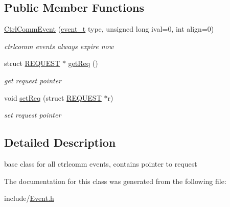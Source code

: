 \subsection*{Public Member Functions}
\begin{DoxyCompactItemize}
\item 
\mbox{\label{classCtrlCommEvent_a85c1ce996cf1112a1d9f28e11af5ed66}} 
\hyperlink{classCtrlCommEvent_a85c1ce996cf1112a1d9f28e11af5ed66}{Ctrl\+Comm\+Event} (\hyperlink{Event_8h_a2fb9b58e4e5f14f40af8b4a1425841f8}{event\+\_\+t} type, unsigned long ival=0, int align=0)
\begin{DoxyCompactList}\small\item\em ctrlcomm events always expire now \end{DoxyCompactList}\item 
\mbox{\label{classCtrlCommEvent_a7fff85bd9d4c6ba4b6717aa0cfe33ef2}} 
struct \hyperlink{structREQUEST}{R\+E\+Q\+U\+E\+ST} $\ast$ \hyperlink{classCtrlCommEvent_a7fff85bd9d4c6ba4b6717aa0cfe33ef2}{get\+Req} ()
\begin{DoxyCompactList}\small\item\em get request pointer \end{DoxyCompactList}\item 
\mbox{\label{classCtrlCommEvent_a81613b45e9e386fd8407eca71e11b23f}} 
void \hyperlink{classCtrlCommEvent_a81613b45e9e386fd8407eca71e11b23f}{set\+Req} (struct \hyperlink{structREQUEST}{R\+E\+Q\+U\+E\+ST} $\ast$r)
\begin{DoxyCompactList}\small\item\em set request pointer \end{DoxyCompactList}\end{DoxyCompactItemize}


\subsection{Detailed Description}
base class for all ctrlcomm events, contains pointer to request 

The documentation for this class was generated from the following file\+:\begin{DoxyCompactItemize}
\item 
include/\hyperlink{Event_8h}{Event.\+h}\end{DoxyCompactItemize}
